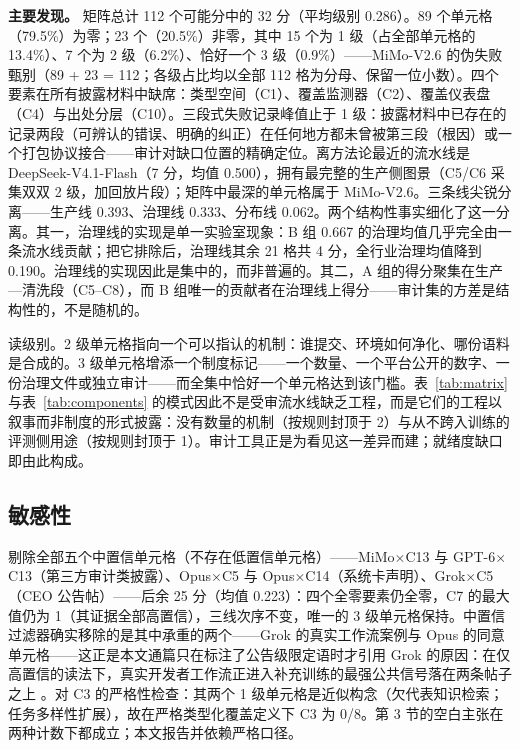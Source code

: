 \documentclass[10pt,fontset=fandol]{ctexart}
\begin{document}
\textbf{主要发现。} 矩阵总计 112 个可能分中的 32 分（平均级别 0.286）。89 个单元格（79.5\%）为零；23 个（20.5\%）非零，其中 15 个为 1 级（占全部单元格的 13.4\%）、7 个为 2 级（6.2\%）、恰好一个 3 级（0.9\%）——MiMo-V2.6 的伪失败甄别（89 + 23 = 112；各级占比均以全部 112 格为分母、保留一位小数）。四个要素在所有披露材料中缺席：类型空间（C1）、覆盖监测器（C2）、覆盖仪表盘（C4）与出处分层（C10）。三段式失败记录峰值止于 1 级：披露材料中已存在的记录两段（可辨认的错误、明确的纠正）在任何地方都未曾被第三段（根因）或一个打包协议接合——审计对缺口位置的精确定位。离方法论最近的流水线是 DeepSeek-V4.1-Flash（7 分，均值 0.500），拥有最完整的生产侧图景（C5/C6 采集双双 2 级，加回放片段）；矩阵中最深的单元格属于 MiMo-V2.6。三条线尖锐分离——生产线 0.393、治理线 0.333、分布线 0.062。两个结构性事实细化了这一分离。其一，治理线的实现是单一实验室现象：B 组 0.667 的治理均值几乎完全由一条流水线贡献；把它排除后，治理线其余 21 格共 4 分，全行业治理均值降到 0.190。治理线的实现因此是集中的，而非普遍的。其二，A 组的得分聚集在生产—清洗段（C5--C8），而 B 组唯一的贡献者在治理线上得分——审计集的方差是结构性的，不是随机的。

读级别。2 级单元格指向一个可以指认的机制：谁提交、环境如何净化、哪份语料是合成的。3 级单元格增添一个制度标记——一个数量、一个平台公开的数字、一份治理文件或独立审计——而全集中恰好一个单元格达到该门槛。表~\ref{tab:matrix} 与表~\ref{tab:components} 的模式因此不是受审流水线缺乏工程，而是它们的工程以叙事而非制度的形式披露：没有数量的机制（按规则封顶于 2）与从不跨入训练的评测侧用途（按规则封顶于 1）。审计工具正是为看见这一差异而建；就绪度缺口即由此构成。

\subsection{敏感性}

剔除全部五个中置信单元格（不存在低置信单元格）——MiMo$\times$C13 与 GPT-6$\times$C13（第三方审计类披露）、Opus$\times$C5 与 Opus$\times$C14（系统卡声明）、Grok$\times$C5（CEO 公告帖）——后余 25 分（均值 0.223）：四个全零要素仍全零，C7 的最大值仍为 1（其证据全部高置信），三线次序不变，唯一的 3 级单元格保持。中置信过滤器确实移除的是其中承重的两个——Grok 的真实工作流案例与 Opus 的同意单元格——这正是本文通篇只在标注了公告级限定语时才引用 Grok 的原因：在仅高置信的读法下，真实开发者工作流正进入补充训练的最强公共信号落在两条帖子之上 \cite{ref21}。对 C3 的严格性检查：其两个 1 级单元格是近似构念（欠代表知识检索；任务多样性扩展），故在严格类型化覆盖定义下 C3 为 0/8。第 3 节的空白主张在两种计数下都成立；本文报告并依赖严格口径。
\end{document}
